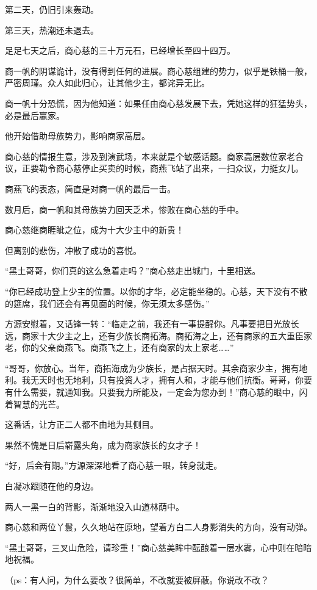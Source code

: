 \begin{this_body}
第二天，仍旧引来轰动。

第三天，热潮还未退去。

足足七天之后，商心慈的三十万元石，已经增长至四十四万。

商一帆的阴谋诡计，没有得到任何的进展。商心慈组建的势力，似乎是铁桶一般，严密周瑾。众人如此归心，让其他少主，都诧异无比。

商一帆十分恐慌，因为他知道：如果任由商心慈发展下去，凭她这样的狂猛势头，必是最后赢家。

他开始借助母族势力，影响商家高层。

商心慈的情报生意，涉及到演武场，本来就是个敏感话题。商家高层数位家老合议，正要勒令商心慈停止买卖的时候，商燕飞站了出来，一扫众议，力挺女儿。

商燕飞的表态，简直是对商一帆的最后一击。

数月后，商一帆和其母族势力回天乏术，惨败在商心慈的手中。

商心慈继商睚眦之位，成为十大少主中的新贵！

但离别的悲伤，冲散了成功的喜悦。

“黑土哥哥，你们真的这么急着走吗？”商心慈走出城门，十里相送。

“你已经成功登上少主的位置。以你的才华，必定能坐稳的。心慈，天下没有不散的筵席，我们还会有再见面的时候，你无须太多感伤。”

方源安慰着，又话锋一转：“临走之前，我还有一事提醒你。凡事要把目光放长远，商家十大少主之上，还有少族长商拓海。商拓海之上，还有商家的五大重臣家老，你的父亲商燕飞。商燕飞之上，还有商家的太上家老……”

“哥哥，你放心。当年，商拓海成为少族长，是占据天时。其余商家少主，拥有地利。我无天时也无地利，只有投资人才，拥有人和，才能与他们抗衡。哥哥，你要有什么需要，就通知我。只要我力所能及，一定会为您办到！”商心慈的眼中，闪着智慧的光芒。

这番话，让方正二人都不由地为其侧目。

果然不愧是日后崭露头角，成为商家族长的女才子！

“好，后会有期。”方源深深地看了商心慈一眼，转身就走。

白凝冰跟随在他的身边。

两人一黑一白的背影，渐渐地没入山道林荫中。

商心慈和两位丫鬟，久久地站在原地，望着方白二人身影消失的方向，没有动弹。

“黑土哥哥，三叉山危险，请珍重！”商心慈美眸中酝酿着一层水雾，心中则在暗暗地祝福。

（ps：有人问，为什么要改？很简单，不改就要被屏蔽。你说改不改？


\end{this_body}

